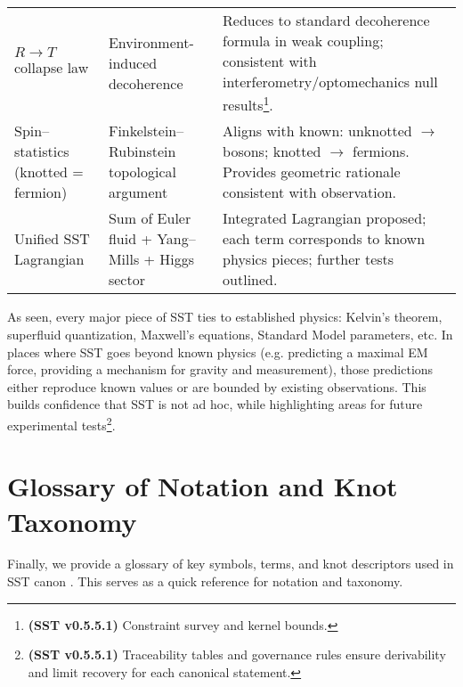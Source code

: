 \documentclass[reprint,aps,onecolumn,nofootinbib]{revtex4-2}
\begin{document}
\begin{table*}[hbt!]
\begin{ruledtabular}
\begin{tabular}{p{4.2cm} p{5.3cm} p{5.3cm}}
    $R\to T$ collapse law & Environment-induced decoherence & Reduces to standard decoherence formula in weak coupling; consistent with interferometry/optomechanics null results\footnote{\textbf{(SST v0.5.5.1)} Constraint survey and kernel bounds.}. \\
    Spin–statistics (knotted = fermion) & Finkelstein–Rubinstein topological argument & Aligns with known: unknotted $\to$ bosons; knotted $\to$ fermions. Provides geometric rationale consistent with observation. \\
    Unified SST Lagrangian & Sum of Euler fluid + Yang–Mills + Higgs sector & Integrated Lagrangian proposed; each term corresponds to known physics pieces; further tests outlined. \\
    \end{tabular}
    \end{ruledtabular}
    \end{table*}

    As seen, every major piece of SST ties to established physics: Kelvin’s theorem, superfluid quantization, Maxwell’s equations, Standard Model parameters, etc. In places where SST goes beyond known physics (e.g. predicting a maximal EM force, providing a mechanism for gravity and measurement), those predictions either reproduce known values or are bounded by existing observations. This builds confidence that SST is not ad hoc, while highlighting areas for future experimental tests\footnote{\textbf{(SST v0.5.5.1)} Traceability tables and governance rules ensure derivability and limit recovery for each canonical statement.}.

\section{Glossary of Notation and Knot Taxonomy}
    Finally, we provide a glossary of key symbols, terms, and knot descriptors used in SST canon \canonversion. This serves as a quick reference for notation and taxonomy.
\end{document}
